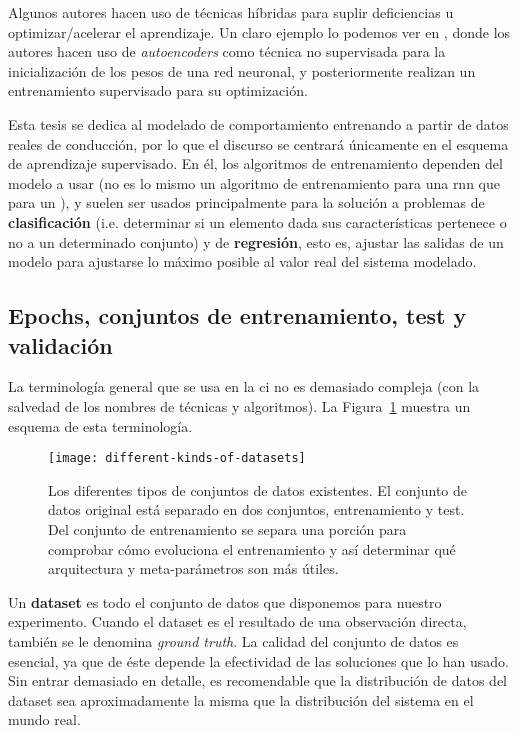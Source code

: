 Algunos autores hacen uso de técnicas híbridas para suplir deficiencias u optimizar/acelerar el aprendizaje. Un claro ejemplo lo podemos ver en \cite{Hinton2006}, donde los autores hacen uso de \textit{\glspl{autoencoder}} como técnica no supervisada para la inicialización de los pesos de una red neuronal, y posteriormente realizan un entrenamiento supervisado para su optimización.

Esta tesis se dedica al modelado de comportamiento entrenando a partir de datos reales de conducción, por lo que el discurso se centrará únicamente en el esquema de aprendizaje supervisado. En él, los algoritmos de entrenamiento dependen del modelo a usar (no es lo mismo un algoritmo de entrenamiento para una \Acrfull{rnn} que para un ), y suelen ser usados principalmente para la solución a problemas de \textbf{clasificación} (i.e. determinar si un elemento dada sus características pertenece o no a un determinado conjunto) y de \textbf{regresión}, esto es, ajustar las salidas de un modelo para ajustarse lo máximo posible al valor real del sistema modelado.

\subsection{Epochs, conjuntos de entrenamiento, test y validación}

La terminología general que se usa en la \gls{ci} no es demasiado compleja (con la salvedad de los nombres de técnicas y algoritmos). La Figura~\ref{fig:different-kinds-of-datasets} muestra un esquema de esta terminología.

\begin{figure}
	\texttt{[image: different-kinds-of-datasets]}
	\caption[Separación clásica de conjuntos de datos en problemas de ]{Los diferentes tipos de conjuntos de datos existentes. El conjunto de datos original está separado en dos conjuntos, entrenamiento y test. Del conjunto de entrenamiento se separa una porción para comprobar cómo evoluciona el entrenamiento y así determinar qué arquitectura y meta-parámetros son más útiles.}
	\label{fig:different-kinds-of-datasets}
\end{figure}

Un \textbf{dataset} es todo el conjunto de datos que disponemos para nuestro experimento. Cuando el dataset es el resultado de una observación directa, también se le denomina \textit{ground truth}. La calidad del conjunto de datos es esencial, ya que de éste depende la efectividad de las soluciones que lo han usado. Sin entrar demasiado en detalle, es recomendable que la distribución de datos del dataset sea aproximadamente la misma que la distribución del sistema en el mundo real.

